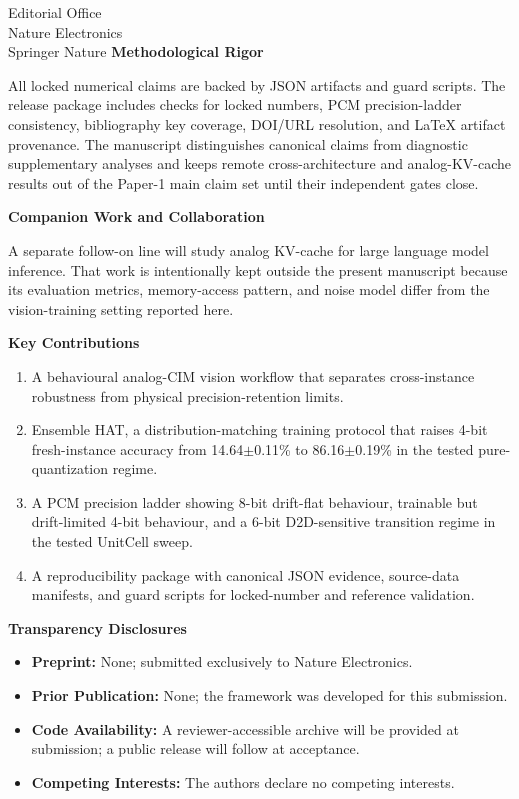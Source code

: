 \documentclass[11pt,a4paper]{letter}
\begin{document}
\begin{letter}{Editorial Office\\Nature Electronics\\Springer Nature}
\vspace{0.5em}
\textbf{Methodological Rigor}

All locked numerical claims are backed by JSON artifacts and guard scripts. The release package includes checks for locked numbers, PCM precision-ladder consistency, bibliography key coverage, DOI/URL resolution, and LaTeX artifact provenance. The manuscript distinguishes canonical claims from diagnostic supplementary analyses and keeps remote cross-architecture and analog-KV-cache results out of the Paper-1 main claim set until their independent gates close.

\vspace{0.5em}
\textbf{Companion Work and Collaboration}

A separate follow-on line will study analog KV-cache for large language model inference. That work is intentionally kept outside the present manuscript because its evaluation metrics, memory-access pattern, and noise model differ from the vision-training setting reported here.

\vspace{0.5em}
\textbf{Key Contributions}

\begin{enumerate}
    \item A behavioural analog-CIM vision workflow that separates cross-instance robustness from physical precision-retention limits.
    \item Ensemble HAT, a distribution-matching training protocol that raises 4-bit fresh-instance accuracy from 14.64$\pm$0.11\% to 86.16$\pm$0.19\% in the tested pure-quantization regime.
    \item A PCM precision ladder showing 8-bit drift-flat behaviour, trainable but drift-limited 4-bit behaviour, and a 6-bit D2D-sensitive transition regime in the tested UnitCell sweep.
    \item A reproducibility package with canonical JSON evidence, source-data manifests, and guard scripts for locked-number and reference validation.
\end{enumerate}

\vspace{0.5em}
\textbf{Transparency Disclosures}

\begin{itemize}
    \item \textbf{Preprint:} None; submitted exclusively to Nature Electronics.
    \item \textbf{Prior Publication:} None; the framework was developed for this submission.
    \item \textbf{Code Availability:} A reviewer-accessible archive will be provided at submission; a public release will follow at acceptance.
    \item \textbf{Competing Interests:} The authors declare no competing interests.
\end{itemize}


\end{letter}
\end{document}

